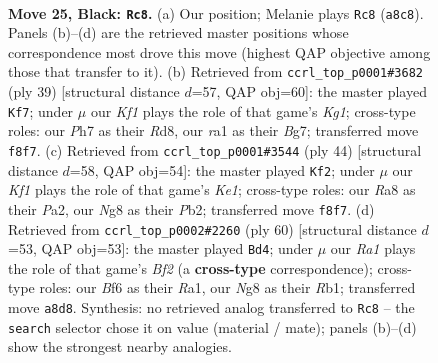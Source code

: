\documentclass[11pt]{article}
\begin{document}
\clearpage

\begin{figure}[p]\centering
\begin{subfigure}{0.46\textwidth}\centering
\resizebox{\linewidth}{!}{%
\newchessgame
\chessboard[
  setfen={r4knr/p6p/2p2bp1/8/4BB2/5P1P/PPP3P1/RR4K1 b - - 1 25},
  showmover=false,
  pgfstyle=straightmove, color=movearrow, markmove={a8-c8}
]}
\caption{}
\end{subfigure}\hfill
\begin{subfigure}{0.46\textwidth}\centering
\resizebox{\linewidth}{!}{%
\newchessgame
\chessboard[
  setfen={r2r2k1/pp4b1/6pp/3p1p2/8/1P1RB1P1/P3PP1P/5RK1 b - - 3 20},
  showmover=false,
  pgfstyle=straightmove, color=movearrow, markmove={g8-f7}
]}
\caption{}
\end{subfigure}
\\[4pt]
\begin{subfigure}{0.46\textwidth}\centering
\resizebox{\linewidth}{!}{%
\newchessgame
\chessboard[
  setfen={r4rk1/1p3p1p/p3p1b1/6p1/4P3/3B1P2/PP4PP/2R1K2R w K - 3 23},
  showmover=false,
  pgfstyle=straightmove, color=movearrow, markmove={e1-f2}
]}
\caption{}
\end{subfigure}\hfill
\begin{subfigure}{0.46\textwidth}\centering
\resizebox{\linewidth}{!}{%
\newchessgame
\chessboard[
  setfen={r1r3k1/5pp1/p4b1p/3p4/1P3P2/2P4P/5BP1/RR4K1 w - - 1 31},
  showmover=false,
  pgfstyle=straightmove, color=movearrow, markmove={f2-d4}
]}
\caption{}
\end{subfigure}
\caption{\textbf{Move 25, Black: \texttt{Rc8}.} (a) Our position; Melanie plays \texttt{Rc8} (\texttt{a8c8}). Panels (b)--(d) are the retrieved master positions whose correspondence most drove this move (highest QAP objective among those that transfer to it). (b) Retrieved from \texttt{ccrl\_top\_p0001\#3682} (ply 39) [structural distance $d$=57, QAP obj=60]: the master played \texttt{Kf7}; under $\mu$ our \emph{Kf1} plays the role of that game's \emph{Kg1}; cross-type roles: our \emph{P}h7 as their \emph{R}d8, our \emph{r}a1 as their \emph{B}g7; transferred move \texttt{f8f7}. (c) Retrieved from \texttt{ccrl\_top\_p0001\#3544} (ply 44) [structural distance $d$=58, QAP obj=54]: the master played \texttt{Kf2}; under $\mu$ our \emph{Kf1} plays the role of that game's \emph{Ke1}; cross-type roles: our \emph{R}a8 as their \emph{P}a2, our \emph{N}g8 as their \emph{P}b2; transferred move \texttt{f8f7}. (d) Retrieved from \texttt{ccrl\_top\_p0002\#2260} (ply 60) [structural distance $d$=53, QAP obj=53]: the master played \texttt{Bd4}; under $\mu$ our \emph{Ra1} plays the role of that game's \emph{Bf2} (a \textbf{cross-type} correspondence); cross-type roles: our \emph{B}f6 as their \emph{R}a1, our \emph{N}g8 as their \emph{R}b1; transferred move \texttt{a8d8}. Synthesis: no retrieved analog transferred to \texttt{Rc8} -- the \texttt{search} selector chose it on value (material / mate); panels (b)--(d) show the strongest nearby analogies.}
\label{fig:thought-m49}
\end{figure}
\end{document}
